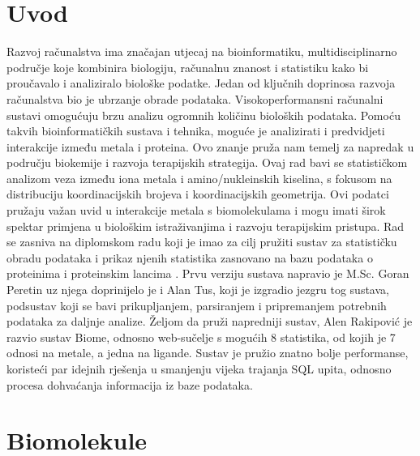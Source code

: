 \documentclass[times, utf8, zavrsni]{fer}
\begin{document}
\zahvala{}

\tableofcontents


\chapter{Uvod}
Razvoj računalstva ima značajan utjecaj na bioinformatiku, multidisciplinarno područje koje kombinira biologiju,
računalnu znanost i statistiku kako bi proučavalo i analiziralo biološke podatke. Jedan od ključnih doprinosa razvoja
računalstva bio je ubrzanje obrade podataka. Visokoperformansni računalni sustavi omogućuju brzu analizu ogromnih količinu bioloških podataka.
Pomoću takvih bioinformatičkih sustava i tehnika, moguće je analizirati i predvidjeti interakcije između metala i proteina. Ovo znanje pruža nam temelj
za napredak u području biokemije i razvoja terapijskih strategija. Ovaj rad bavi se statističkom analizom veza između iona metala i amino/nukleinskih kiselina, s fokusom
na distribuciju koordinacijskih brojeva i koordinacijskih geometrija. Ovi podatci pružaju važan uvid u interakcije metala s biomolekulama i mogu imati širok spektar primjena
u biološkim istraživanjima i razvoju terapijskim pristupa. Rad se zasniva na diplomskom radu \cite{rakipovic}  koji je imao za cilj pružiti sustav za statističku obradu podataka 
i prikaz njenih statistika zasnovano na bazu podataka o proteinima i proteinskim lancima  \cite{alanTus2010}. Prvu verziju sustava napravio je M.Sc. Goran Peretin \cite{peretin} uz njega doprinijelo je i Alan Tus, koji je izgradio jezgru tog sustava, podsustav koji se bavi prikupljanjem, parsiranjem i pripremanjem potrebnih podataka za daljnje analize. 
Željom da pruži napredniji sustav, Alen Rakipović je razvio sustav Biome, odnosno web-sučelje s mogućih 8 statistika, od kojih je 7 odnosi na metale, a jedna na ligande.
Sustav je pružio znatno bolje performanse, koristeći par idejnih rješenja u smanjenju vijeka trajanja SQL upita, odnosno procesa dohvaćanja informacija iz baze podataka.

\chapter{Biomolekule}
\end{document}
